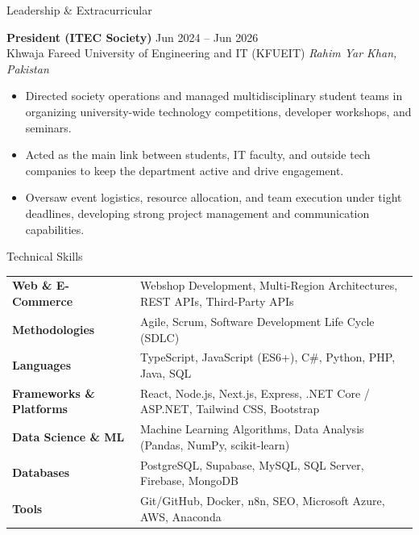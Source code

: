 \documentclass{resume} %
\begin{document}

\begin{rSection}{Leadership \& Extracurricular}

\textbf{President (ITEC Society)} \hfill Jun 2024 -- Jun 2026\\
Khwaja Fareed University of Engineering and IT (KFUEIT) \hfill \textit{Rahim Yar Khan, Pakistan}
 \begin{itemize}
    \itemsep -3pt {} 
     \item Directed society operations and managed multidisciplinary student teams in organizing university-wide technology competitions, developer workshops, and seminars.
     \item Acted as the main link between students, IT faculty, and outside tech companies to keep the department active and drive engagement.
     \item Oversaw event logistics, resource allocation, and team execution under tight deadlines, developing strong project management and communication capabilities.
 \end{itemize}

\end{rSection}


\begin{rSection}{Technical Skills}

\begin{tabular}{ @{} >{\bfseries}l @{\hspace{2ex}} l }
Web \& E-Commerce & Webshop Development, Multi-Region Architectures, REST APIs, Third-Party APIs \\
Methodologies & Agile, Scrum, Software Development Life Cycle (SDLC) \\
Languages & TypeScript, JavaScript (ES6+), C\#, Python, PHP, Java, SQL \\
Frameworks \& Platforms & React, Node.js, Next.js, Express, .NET Core / ASP.NET, Tailwind CSS, Bootstrap \\
Data Science \& ML & Machine Learning Algorithms, Data Analysis (Pandas, NumPy, scikit-learn) \\
Databases & PostgreSQL, Supabase, MySQL, SQL Server, Firebase, MongoDB \\
Tools & Git/GitHub, Docker, n8n, SEO, Microsoft Azure, AWS, Anaconda
\end{tabular}\\
\end{rSection}
\end{document}
